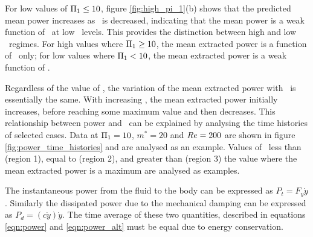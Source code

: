 

For low values of $\Pi_1 \leq 10$, figure \ref{fig:high_pi_1}(b) shows that the predicted mean power increases as \massstiff\ is decreased, indicating that the mean power is a weak function of \massstiff\ at low \massstiff\ levels. This provides the distinction between high and low \massstiff\ regimes. For high values where $\Pi_1 \geq 10$, the mean extracted power is a function of \massdamp\ only; for low values where $\Pi_1 < 10$, the mean extracted power is a weak function of \massstiff.

Regardless of the value of \massstiff, the variation of the mean extracted power with \massdamp\ is essentially the same. With increasing \massdamp, the mean extracted power initially increases, before reaching some maximum value and then decreases. This relationship between power and \massdamp\ can be explained by analysing the time histories of selected cases. Data at $\Pi_1=10$, $m^*=20$ and $Re=200$ are shown in figure \ref{fig:power_time_histories} and are analysed as an example. Values of \massdamp\ less than (region 1), equal to (region 2), and greater than (region 3) the value where the mean extracted power is a maximum are analysed as examples.



The instantaneous power from the fluid to the body can be expressed as $P_t=F_y\dot{y}$. Similarly the dissipated power due to the mechanical damping can be expressed as $P_d=(c\dot{y})\dot{y}$. The time average of these two quantities, described in equations \ref{eqn:power} and \ref{eqn:power_alt} must be equal due to energy conservation.



